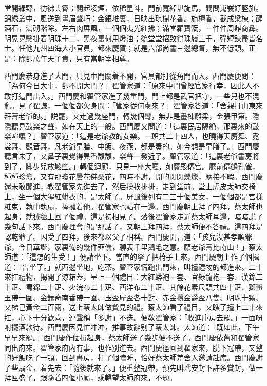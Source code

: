 \begin{myquote}
堂開綠野，彷彿雲霄；閣起凌煙，依稀星斗。門前寬綽堪旋馬，閥閲嵬峩好竪旗。錦綉叢中，風送到畫眉聲巧；金銀堆裏，日映出琪樹花香。旃檀香，截成梁棟；醒酒石，滿砌階除。左右肉屏風，一個個夷光紅拂；滿堂羅寳翫，一件件周鼎商彝。明晃晃懸掛着明珠十二，黑夜裏何用燈油；貌堂堂招致得珠履三千，彈短鋏盡皆名士。任他九州四海大小官員，都來慶賀；就是六部尚書三邊總督，無不低頭。正是：除卻萬年天子貴，只有當朝宰相尊。
\end{myquote}

西門慶恭身進了大門，只見中門關着不開，官員都打從角門而入。西門慶便問：「為何今日大事，卻不開大門？」翟管家道：「原來中門曾經官家行幸，因此人不敢打這門出入。」西門慶和翟管家進了幾重門，門上都是武官把守，一些兒也不混亂。見了翟謙，一個個都欠身問：「管家従何䖏來？」翟管家答道：「舍親打山東來拜壽老爺的。」説罷，又走過幾座門，轉幾個彎，無非是畫棟雕梁，金張甲第。隱隱聽見鼓楽之聲，如在天上的一般。西門慶又問道：「這裏民居隔絶，那裏來的鼓楽喧嚷？」翟管家道：「這是老爺教的女樂。一班共二十四人，也曉得天魔舞、霓裳舞、觀音舞，凡老爺早膳、中飯、夜燕，都是奏的。如今想是早膳了。」西門慶聽言未了，又鼻子裏覺得異香馥馥，楽聲一發近了。翟管家道：「這裏老爺書房將到了，脚步兒放鬆些。」轉個迴廊，只見一座大廳，如寳殿僊宫。廳前僊鶴孔雀，種種珍禽，又有那瓊花曇花佛桑花，四時不謝，開的閃閃爍爍，應接不暇。西門慶還未敢闖進，教翟管家先進去了，然后挨挨排排，走到堂前。堂上虎皮太師交椅上，坐一個大猩紅蟒衣的，是太師了。屏風後列有二三十個美女，一個個都是宫樣粧束，執巾執扇，捧擁着他。翟管家也站在一邊。西門慶朝上拜了四拜，蔡太師也起身，就狨毯上回了個禮。這是初相見了。落後翟管家走近蔡太師耳邊，暗暗説了幾句話下來。西門慶理會的是那話了，又朝上拜四拜，蔡太師便不答禮。這四拜是認乾爺了。因受了四拜，後來都以父子相稱。西門慶開言道：「孩兒沒甚孝順爺爺，今日華誕，家裏備的幾件菲儀，聊表千里鵝毛之意。願老爺壽比南山！」蔡太師道：「這怎的生受！」便請坐下。當直的拏了把椅子上來，西門慶朝上作了個揖道：「告坐了。」就西邊坐地，吃茶。翟管家慌跑出門來，叫擡禮物的都進來。二十來扛禮物，揭開了涼箱蓋，呈上一個禮目：大紅蟒袍一套、官綠龍袍一套、漢錦二十疋、蜀錦二十疋、火浣布二十疋、西洋布二十疋、其餘花素尺頭共四十疋、獅蠻玉帶一圍、金鑲奇南香帶一圍、玉盃犀盃各十對、赤金攢金爵盃八隻、明珠十顆、又梯己黃金二百兩，送上蔡太師做贄見的禮。蔡太師看了禮目，又瞧了擡上二十來扛，心下十分歡喜，連聲稱「多謝」不迭。便敎翟管家：「收進庫房去罷。」一面吩咐擺酒款待。西門慶因見忙冲冲，推事故辭别了蔡太師。太師道：「既如此，下午早早來罷。」西門慶作個揖起身，蔡太師送了幾步便不送了。西門慶依舊和翟管家同出府來。翟管家府内有事，也作別進去。西門慶徑回到翟家來，脱下冠帶，又整的好飯吃了一頓。回到書房，打了個瞌睡，恰好蔡太師差舍人邀請赴席。西門慶謝了些扇金，着先去：「隨後就來了。」便重整冠帶，預先叫玳安封下許多賞封，做一拜匣盛了，跟隨着四個小廝，乘轎望太師府來，不題。

